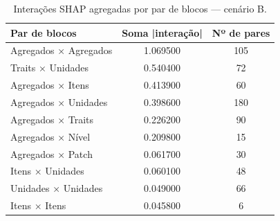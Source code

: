 \begin{table}[htbp]
\caption{Interações SHAP agregadas por par de blocos — cenário B.}
\label{tab:interbB}
\centering
\small
\begin{tabular}{lcc}
\toprule
Par de blocos & Soma |interação| & Nº de pares \\
\midrule
Agregados × Agregados & 1.069500 & 105 \\
Traits × Unidades & 0.540400 & 72 \\
Agregados × Itens & 0.413900 & 60 \\
Agregados × Unidades & 0.398600 & 180 \\
Agregados × Traits & 0.226200 & 90 \\
Agregados × Nível & 0.209800 & 15 \\
Agregados × Patch & 0.061700 & 30 \\
Itens × Unidades & 0.060100 & 48 \\
Unidades × Unidades & 0.049000 & 66 \\
Itens × Itens & 0.045800 & 6 \\
\bottomrule
\end{tabular}
\end{table}
